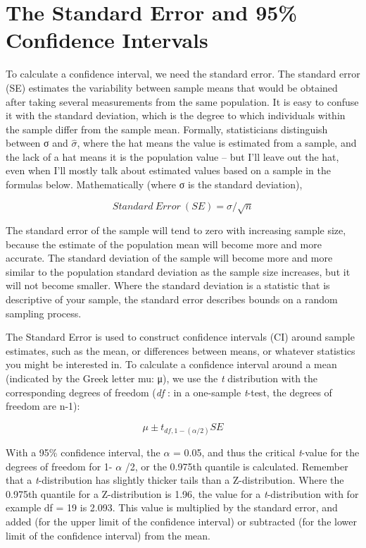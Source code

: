 \documentclass[
  oneside]{book}
\begin{document}
\hypertarget{the-standard-error-and-95-confidence-intervals}{%
\section{The Standard Error and 95\% Confidence Intervals}\label{the-standard-error-and-95-confidence-intervals}}

To calculate a confidence interval, we need the standard error. The standard error (SE) estimates the variability between sample means that would be obtained after taking several measurements from the same population. It is easy to confuse it with the standard deviation, which is the degree to which individuals within the sample differ from the sample mean. Formally, statisticians distinguish between σ and \(\widehat{\sigma}\), where the hat means the value is estimated from a sample, and the lack of a hat means it is the population value -- but I'll leave out the hat, even when I'll mostly talk about estimated values based on a sample in the formulas below. Mathematically (where σ is the standard
deviation),

\[
Standard \ Error \ (SE) = \sigma/\sqrt n
\]

The standard error of the sample will tend to zero with increasing sample size, because the estimate of the population mean will become more and more accurate. The standard deviation of the sample will become more and more similar to the population standard deviation as the sample size increases, but it will not become smaller. Where the standard deviation is a statistic that is descriptive of your sample, the standard error describes bounds on a random sampling process.

The Standard Error is used to construct confidence intervals (CI) around sample estimates, such as the mean, or differences between means, or whatever statistics you might be interested in. To calculate a confidence interval around a mean (indicated by the Greek letter mu: μ), we use the \emph{t} distribution with the corresponding degrees of freedom (\emph{df} : in a one-sample \emph{t}-test, the degrees of freedom are n-1):

\[
\mu \pm t_{df, 1-(\alpha/2)} SE
\]

With a 95\% confidence interval, the \(\alpha\) = 0.05, and thus the critical \emph{t}-value for the degrees of freedom for 1- \(\alpha\) /2, or the 0.975th quantile is calculated. Remember that a \emph{t}-distribution has slightly thicker tails than a Z-distribution. Where the 0.975th quantile for a Z-distribution is 1.96, the value for a \emph{t}-distribution with for example df = 19 is 2.093. This value is multiplied by the standard error, and added (for the upper limit of the confidence interval) or subtracted (for the lower limit of the confidence interval) from the mean.
\end{document}
